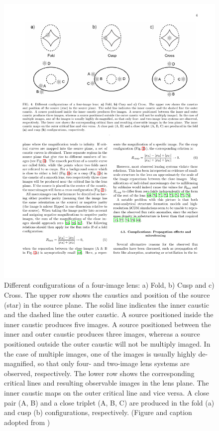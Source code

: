 \documentclass[paper=a4, fontsize=11pt]{scrartcl} %
\numberwithin{equation}{section} %
\numberwithin{figure}{section} %
\numberwithin{table}{section} %
\begin{document}
 \begin{figure}[ht]
 \label{fig:cusps}
 \centering
 \includegraphics[width=1.0\textwidth]{figs/zack09_4}
 \caption{Different configurations of a four-image lens: a) Fold, b) Cusp and c) Cross. The upper row shows the caustics and position of the source (star) in the source plane. The solid line indicates the inner caustic and the dashed line the outer caustic. A source positioned inside the inner caustic produces five images. A source positioned between the inner and outer caustic produces three images, whereas a source positioned outside the outer caustic will not be multiply imaged. In the case of multiple images, one of the images is usually highly de-magnified, so that only four- and two-image lens systems are observed, respectively. The lower row shows the corresponding critical lines and resulting observable images in the lens plane. The inner caustic maps on the outer critical line and vice versa. A close pair (A, B) and a close triplet (A, B, C) are produced in the fold (a) and cusp (b) configurations, respectively. (Figure and caption adopted from \citet{zackrisson09})}
 \end{figure} 
\end{document}
